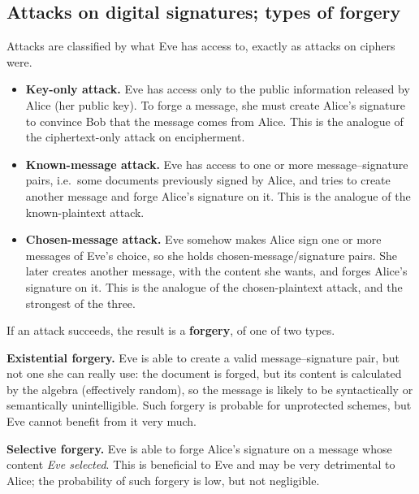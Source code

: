 \subsection{Attacks on digital signatures; types of forgery \new}

Attacks are classified by what Eve has access to, exactly as attacks on ciphers were.
\begin{itemize}[leftmargin=1.4em]
  \item \textbf{Key-only attack.} Eve has access only to the public information released by Alice (her public key). To forge a message, she must create Alice's signature to convince Bob that the message comes from Alice. This is the analogue of the ciphertext-only attack on encipherment.
  \item \textbf{Known-message attack.} Eve has access to one or more message--signature pairs, i.e.\ some documents previously signed by Alice, and tries to create another message and forge Alice's signature on it. This is the analogue of the known-plaintext attack.
  \item \textbf{Chosen-message attack.} Eve somehow makes Alice sign one or more messages of Eve's choice, so she holds chosen-message/signature pairs. She later creates another message, with the content she wants, and forges Alice's signature on it. This is the analogue of the chosen-plaintext attack, and the strongest of the three.
\end{itemize}
If an attack succeeds, the result is a \textbf{forgery}, of one of two types.

\textbf{Existential forgery.} Eve is able to create a valid message--signature pair, but not one she can really use: the document is forged, but its content is calculated by the algebra (effectively random), so the message is likely to be syntactically or semantically unintelligible. Such forgery is probable for unprotected schemes, but Eve cannot benefit from it very much.

\textbf{Selective forgery.} Eve is able to forge Alice's signature on a message whose content \emph{Eve selected}. This is beneficial to Eve and may be very detrimental to Alice; the probability of such forgery is low, but not negligible.

